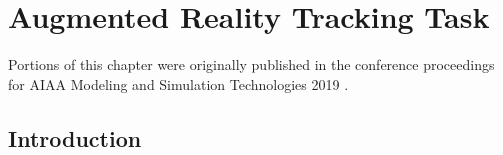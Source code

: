 \chapter{Augmented Reality Tracking Task}
\label{chap:3dtracking}

Portions of this chapter were originally published in the conference proceedings for AIAA Modeling and Simulation Technologies 2019 \citep{karasinski_evaluating_2019}.


\section{Introduction}
